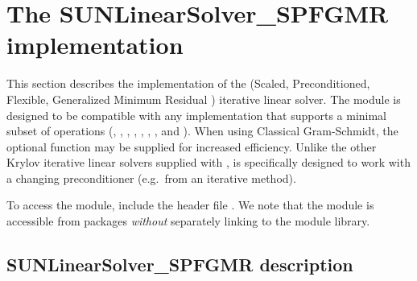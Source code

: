 \section{The SUNLinearSolver\_SPFGMR implementation}
\label{ss:sunlinsol_spfgmr}

This section describes the {\sunlinsol} implementation of the {\spfgmr}
(Scaled, Preconditioned, Flexible, Generalized Minimum Residual \cite{Saa:93})
iterative linear solver. The {\sunlinsolspfgmr} module is designed to be
compatible with any {\nvector} implementation that supports a minimal subset
of operations (, , ,
, , , , and
). When using Classical Gram-Schmidt, the optional function
 may be supplied for increased efficiency.
Unlike the other Krylov iterative linear solvers supplied with {\sundials},
{\spfgmr} is specifically designed to work with a changing preconditioner
(e.g.~from an iterative method).

To access the {\sunlinsolspfgmr} module, include the header file
. We note that the {\sunlinsolspfgmr} module is
accessible from {\sundials} packages \textit{without} separately linking to
the  module library.


\subsection{SUNLinearSolver\_SPFGMR description}
\label{ss:sunlinsol_spfgmr_description}

